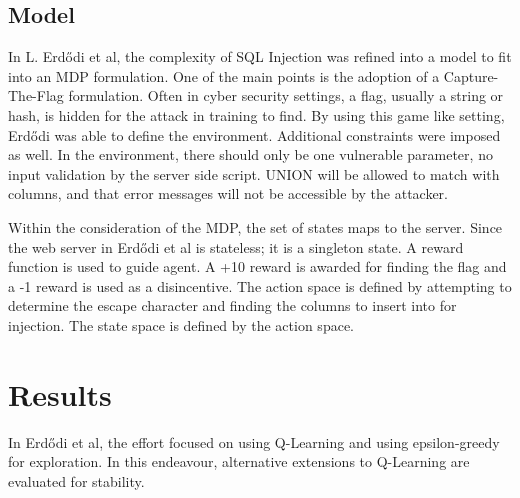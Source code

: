 \documentclass[conference]{IEEEtran}
\begin{document}


\subsection{Model}
In L. Erdődi et al, the complexity of SQL Injection was refined into a model to fit into an MDP formulation. One of the main points is the adoption of a Capture-The-Flag formulation. Often in cyber security settings, a flag, usually a string or hash, is hidden for the attack in training to find. By using this game like setting, Erdődi was able to define the environment. Additional constraints were imposed as well. In the environment, there should only be one vulnerable parameter, no input validation by the server side script. UNION will be allowed to match with columns, and that error messages will not be accessible by the attacker. 

Within the consideration of the MDP, the set of states maps to the server. Since the web server in Erdődi et al is stateless; it is a singleton state. A reward function is used to guide agent. A +10 reward is awarded for finding the flag and a -1 reward is used as a disincentive. The action space is defined by attempting to determine the escape character and finding the columns to insert into for injection. The state space is defined by the action space. 

\section{Results}
In Erdődi et al, the effort focused on using Q-Learning and using epsilon-greedy for exploration. In this endeavour, alternative extensions to Q-Learning are evaluated for stability. 
\end{document}
